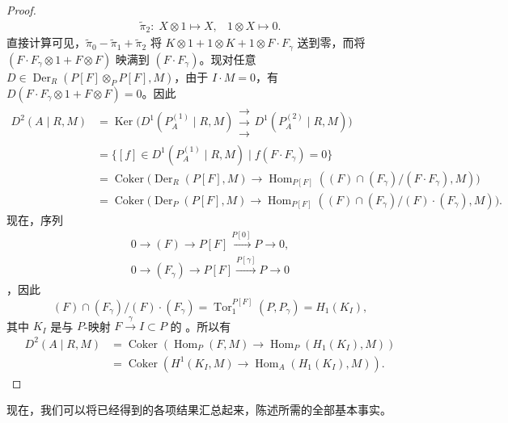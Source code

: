 \begin{proof}
\[\begin{array}{ll}
\widetilde\pi_2:\;X\otimes1\mapsto X,&1\otimes X\mapsto0.
\end{array}
\]
直接计算可见，$\widetilde\pi_0-\widetilde\pi_1+\widetilde\pi_2$ 将 $K\otimes1+1\otimes K+1\otimes F\cdot F_\gamma$ 送到零，而将 $(F\cdot F_\gamma\otimes1+F\otimes F)$ 映满到 $(F\cdot F_\gamma)$。现对任意 $D\in\operatorname{Der}_R(P[F]\otimes_P P[F],M)$，由于 $I\cdot M=0$，有 $D(F\cdot F_\gamma\otimes1+F\otimes F)=0$。因此
\[
\begin{aligned}
D^2(A\mid R,M)
&=\operatorname{Ker}\bigl(D^1(P_A^{(1)}\mid R,M)\mathrel{\substack{\longrightarrow\\[-.7ex]\longrightarrow\\[-.7ex]\longrightarrow}}D^1(P_A^{(2)}\mid R,M)\bigr)\\
&=\{[f]\in D^1(P_A^{(1)}\mid R,M)\mid f(F\cdot F_\gamma)=0\}\\
&=\operatorname{Coker}\bigl(\operatorname{Der}_R(P[F],M)\to\operatorname{Hom}_{P[F]}((F)\cap(F_\gamma)/(F\cdot F_\gamma),M)\bigr)\\
&=\operatorname{Coker}\bigl(\operatorname{Der}_P(P[F],M)\to\operatorname{Hom}_{P[F]}((F)\cap(F_\gamma)/(F)\cdot(F_\gamma),M)\bigr).
\end{aligned}
\]
现在，序列
\[
\begin{aligned}
0\to(F)\to P[F]\xrightarrow{P[0]}P\to0,\\
0\to(F_\gamma)\to P[F]\xrightarrow{P[\gamma]}P\to0
\end{aligned}
\]
，因此
\[(F)\cap(F_\gamma)/(F)\cdot(F_\gamma)=\operatorname{Tor}^{P[F]}_1(P,P_\gamma)=H_1(K_I),\]
其中 $K_I$ 是与 $P$-映射 $F\xrightarrow{\gamma}I\subset P$ 的 。所以有
\[
\begin{aligned}
D^2(A\mid R,M)&=\operatorname{Coker}(\operatorname{Hom}_P(F,M)\to\operatorname{Hom}_P(H_1(K_I),M))\\
&=\operatorname{Coker}(H^1(K_I,M)\to\operatorname{Hom}_A(H_1(K_I),M)).
\end{aligned}
\]
\end{proof}
现在，我们可以将已经得到的各项结果汇总起来，陈述所需的全部基本事实。

